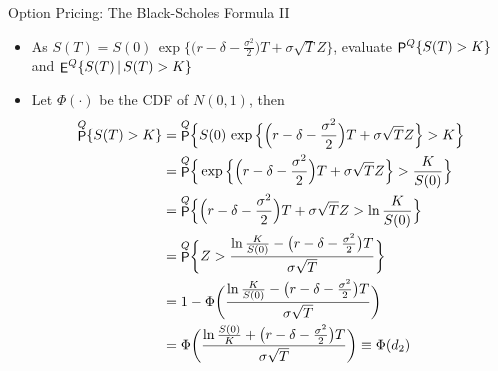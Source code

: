 \documentclass[10pt,handout]{beamer}
\DeclareMathOperator\prb{{\sf P}}
\DeclareMathOperator\expc{{\sf E}}
\theoremstyle{definition}
\begin{document}
\begin{frame}{Option Pricing: The Black-Scholes Formula II}
  \begin{itemize} 
    \item As $S(T) = S(0)\,\exp\big\{\big(r - \delta - \frac{\sigma^2}{2}\big)T + \sigma\sqrt{T}Z\big\}$, evaluate $\prb^Q\{S(T) > K\}$ and $\expc^Q\{S(T)\,|\, S(T) > K\}$
    \item Let $\Phi(\cdot)$ be the CDF of $N(0, 1)$, then \vspace{-3mm}
      \begin{align*}
        \prb^Q\{S(T) > K\} &= \prb^Q\!\Big\{S(0)\,\exp\Big\{\Big(r - \delta - \frac{\sigma^2}{2}\Big)T + \sigma\sqrt{T}Z\Big\} > K\Big\} \\ 
        &=\prb^Q\!\Big\{\exp\Big\{\Big(r - \delta - \frac{\sigma^2}{2}\Big)T + \sigma\sqrt{T}Z\Big\} > \frac{K}{S(0)}\Big\} \\
        &=\prb^Q\!\Big\{\Big(r - \delta - \frac{\sigma^2}{2}\Big)T + \sigma\sqrt{T}Z > \ln\frac{K}{S(0)}\Big\} \\
        &=\prb^Q\!\bigg\{Z > \frac{\ln\frac{K}{S(0)} - \big(r - \delta - \frac{\sigma^2}{2}\big)T}{\sigma\sqrt{T}}\bigg\} \\
        &=1 - \Phi\bigg(\frac{\ln\frac{K}{S(0)} - \big(r - \delta - \frac{\sigma^2}{2}\big)T}{\sigma\sqrt{T}}\bigg) \\
        &=\Phi\bigg(\frac{\ln\frac{S(0)}{K} + \big(r - \delta - \frac{\sigma^2}{2}\big)T}{\sigma\sqrt{T}}\bigg) \equiv \Phi(d_2)
      \end{align*}
  \end{itemize}
\end{frame}
\end{document}

